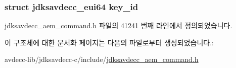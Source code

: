 \subsubsection[{\texorpdfstring{key\+\_\+id}{key_id}}]{\setlength{\rightskip}{0pt plus 5cm}struct {\bf jdksavdecc\+\_\+eui64} key\+\_\+id}\hypertarget{structjdksavdecc__aem__command__enable__transport__security__response_a37cbdf6056556ccfaee3ab01dc7c3032}{}\label{structjdksavdecc__aem__command__enable__transport__security__response_a37cbdf6056556ccfaee3ab01dc7c3032}


jdksavdecc\+\_\+aem\+\_\+command.\+h 파일의 41241 번째 라인에서 정의되었습니다.



이 구조체에 대한 문서화 페이지는 다음의 파일로부터 생성되었습니다.\+:\begin{DoxyCompactItemize}
\item 
avdecc-\/lib/jdksavdecc-\/c/include/\hyperlink{jdksavdecc__aem__command_8h}{jdksavdecc\+\_\+aem\+\_\+command.\+h}\end{DoxyCompactItemize}
